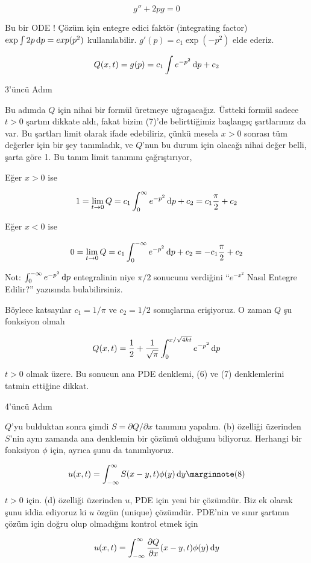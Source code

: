 \documentclass[12pt,fleqn]{article}\usepackage{../../common}
\begin{document}
$$ g'' + 2pg = 0 $$

Bu bir ODE ! Çözüm için entegre edici faktör (integrating factor) $\exp \int 2p
\,\mathrm{d} p = exp(p^2)$ kullanılabilir. $g'(p) = c_1 \exp(-p^2)$ elde ederiz.

$$ Q(x,t) = g(p) = c_1 \int e^{-p^2} \,\mathrm{d} p + c_2 $$

3'üncü Adım 

Bu adımda $Q$ için nihai bir formül üretmeye uğraşacağız. Üstteki formül
sadece $t>0$ şartını dikkate aldı, fakat bizim (7)'de belirttiğimiz
başlangıç şartlarımız da var. Bu şartları limit olarak ifade edebiliriz,
çünkü mesela $x>0$ sonrası tüm değerler için bir şey tanımladık, ve $Q$'nun bu
durum için olacağı nihai değer belli, şarta göre 1. Bu tanım limit tanımını
çağrıştırıyor, 

Eğer $x>0$ ise

$$ 1 = \lim_{t \to 0} Q = 
 c_1 \int_0^{\infty} e^{-p^2} \,\mathrm{d} p + c_2 = 
c_1 \frac{\pi}{2} + c_2
 $$

Eğer $x<0$ ise

$$
0 = \lim_{t \to 0} Q = 
 c_1 \int_0^{-\infty} e^{-p^2} \,\mathrm{d} p + c_2 = 
-c_1 \frac{\pi}{2} + c_2
 $$

Not: $\int_0^{-\infty} e^{-p^2} \,\mathrm{d} p$ entegralinin niye $\pi/2$ sonucunu
verdiğini ``$e^{-x^2}$ Nasıl Entegre Edilir?'' yazısında bulabilirsiniz.

Böylece katsayılar $c_1 = 1/\pi$ ve $c_2 = 1/2$ sonuçlarına erişiyoruz. O
zaman $Q$ şu fonksiyon olmalı

$$
Q(x,t) = 
\frac{1}{2} + \frac{ 1}{\sqrt{\pi}} \int _{0}^{x/\sqrt{4kt}} e^{-p^2} \,\mathrm{d} p
$$

$t>0$ olmak üzere. Bu sonucun ana PDE denklemi, (6) ve (7) denklemlerini
tatmin ettiğine dikkat. 

4'üncü Adım

$Q$'yu bulduktan sonra şimdi $S = \partial Q/\partial x$ tanımını
yapalım. (b) özelliği üzerinden $S$'nin aynı zamanda ana denklemin bir
çözümü olduğunu biliyoruz. Herhangi bir fonksiyon $\phi$ için, ayrıca şunu
da tanımlıyoruz. 

$$
u(x,t) = \int _{-\infty}^{\infty} S(x-y,t) \phi(y) \ud y  \mlabel{8}
$$

$t>0$ için. (d) özelliği üzerinden $u$, PDE için yeni bir çözümdür. Biz ek
olarak şunu iddia ediyoruz ki $u$ özgün (unique) çözümdür. PDE'nin ve
sınır şartının çözüm için doğru olup olmadığını kontrol etmek için 

$$
u(x,t) = \int _{-\infty}^{\infty} 
\frac{\partial Q}{\partial x}(x-y,t)\phi(y) \,\mathrm{d} y
$$
\end{document}
